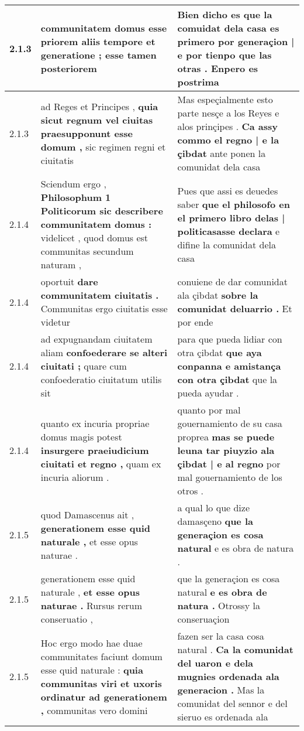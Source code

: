 \begin{tabular}{|p{1cm}|p{6.5cm}|p{6.5cm}|}
2.1.3 & communitatem domus \textbf{ esse priorem aliis tempore et generatione ; } esse tamen posteriorem & Bien dicho es que la comuidat dela casa es primero \textbf{ por generaçion | e por tienpo que las otras . } Enpero es postrima \\\hline
2.1.3 & ad Reges et Principes , \textbf{ quia sicut regnum vel ciuitas praesupponunt esse domum , } sic regimen regni et ciuitatis & Mas espeçialmente esto parte nesçe a los Reyes e alos prinçipes . \textbf{ Ca assy commo el regno | e la çibdat } ante ponen la comunidat dela casa \\\hline
2.1.4 & Sciendum ergo , \textbf{ Philosophum 1 Politicorum sic describere communitatem domus : } videlicet , quod domus est communitas secundum naturam , & Pues que assi es deuedes saber \textbf{ que el philosofo en el primero libro delas | politicasasse declara } e difine la comunidat dela casa \\\hline
2.1.4 & oportuit \textbf{ dare communitatem ciuitatis . } Communitas ergo ciuitatis esse videtur & conuiene de dar comunidat ala çibdat \textbf{ sobre la comunidat deluarrio . } Et por ende \\\hline
2.1.4 & ad expugnandam ciuitatem aliam \textbf{ confoederare se alteri ciuitati ; } quare cum confoederatio ciuitatum utilis sit & para que pueda lidiar con otra çibdat \textbf{ que aya conpanna e amistança con otra çibdat } que la pueda ayudar . \\\hline
2.1.4 & quanto ex incuria propriae domus magis potest \textbf{ insurgere praeiudicium ciuitati et regno , } quam ex incuria aliorum . & quanto por mal gouernamiento de su casa proprea \textbf{ mas se puede leuna tar piuyzio ala çibdat | e al regno } por mal gouernamiento de los otros . \\\hline
2.1.5 & quod Damascenus ait , \textbf{ generationem esse quid naturale , } et esse opus naturae . & a qual lo que dize damasçeno \textbf{ que la generaçion es cosa natural } e es obra de natura . \\\hline
2.1.5 & generationem esse quid naturale , \textbf{ et esse opus naturae . } Rursus rerum conseruatio , & que la generaçion es cosa natural \textbf{ e es obra de natura . } Otrossy la conseruaçion \\\hline
2.1.5 & Hoc ergo modo hae duae communitates faciunt domum esse quid naturale : \textbf{ quia communitas viri et uxoris ordinatur ad generationem , } communitas vero domini & fazen ser la casa cosa natural . \textbf{ Ca la comunidat del uaron e dela mugnies ordenada ala generacion . } Mas la comunidat del sennor e del sieruo es ordenada ala \\\hline

\end{tabular}
